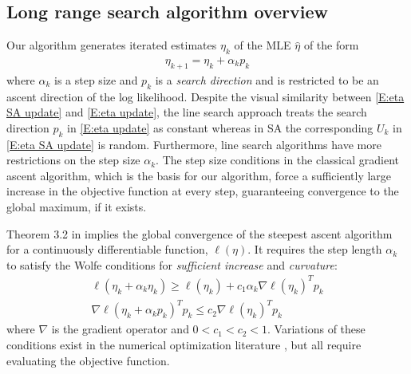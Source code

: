 \subsection{Long range search algorithm overview}  \label{S:algorithm overview}

Our algorithm generates iterated estimates $\eta_k$ of the MLE $\hat{\eta}$ of the 
form 
\begin{align} \label{E:eta update}
	\eta_{k+1} = \eta_k + \alpha_k p_k
\end{align}
where $\alpha_k$ is a step size and $p_k$ is a \emph{search direction} and is 
restricted to be an ascent direction of 
the log likelihood.  
Despite the visual similarity between \eqref{E:eta SA update} and \eqref{E:eta 
update}, the line search approach treats 
the search direction $p_k$ in \eqref{E:eta update} as constant whereas in SA the 
corresponding $U_k$ in \eqref{E:eta SA update} is random.
Furthermore, line search algorithms have more restrictions on the step size $\alpha_k$.  
The step size 
conditions in the classical gradient ascent algorithm, which is the basis for our 
algorithm, force  a sufficiently 
large increase in the objective function at every step, guaranteeing convergence to 
the global maximum, if it exists.

Theorem 3.2 in \citep{NW} implies the global convergence of the steepest ascent 
algorithm for a continuously differentiable function, $\ell(\eta)$.  It requires the 
step length $\alpha_k$ to satisfy 
the Wolfe conditions for \emph{sufficient increase} and \emph{curvature}:
\begin{equation} \label{eq:wolfe}
\begin{split}
	\ell(\eta_k + \alpha_k \eta_k) \geq \ell(\eta_k) + c_1 \alpha_k \nabla \ell (\eta_k)^T p_k \\
	\nabla \ell( \eta_k + \alpha_k p_k)^T p_k \leq c_2 \nabla \ell( \eta_k)^T p_k
\end{split}
\end{equation}
where $\nabla$ is the gradient operator and $0 < c_1 < c_2 < 1$.   
Variations of these conditions exist in the numerical optimization literature \citep
{Fletcher,NW,Sun:2006}, but all 
require evaluating the objective function.

